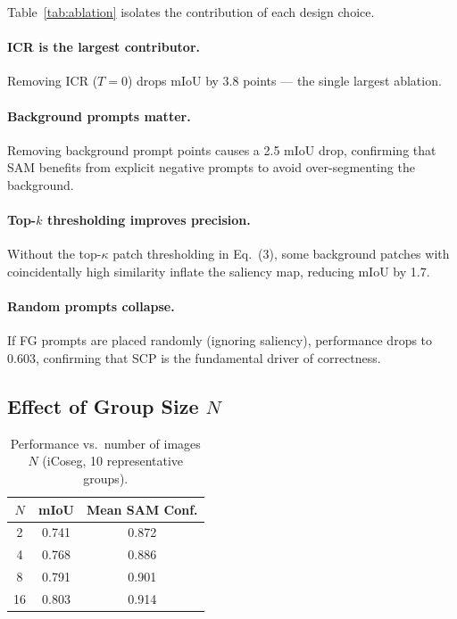 \documentclass[10pt,twocolumn,letterpaper]{article}
\begin{document}
Table~\ref{tab:ablation} isolates the contribution of each design choice.

\paragraph{ICR is the largest contributor.}
Removing ICR ($T=0$) drops mIoU by 3.8 points — the single largest ablation.

\paragraph{Background prompts matter.}
Removing background prompt points causes a 2.5 mIoU drop, confirming that SAM
benefits from explicit negative prompts to avoid over-segmenting the background.

\paragraph{Top-$k$ thresholding improves precision.}
Without the top-$\kappa$ patch thresholding in Eq.~(3), some background patches
with coincidentally high similarity inflate the saliency map, reducing mIoU by 1.7.

\paragraph{Random prompts collapse.}
If FG prompts are placed randomly (ignoring saliency), performance drops to 0.603,
confirming that SCP is the fundamental driver of correctness.

\subsection{Effect of Group Size $N$}

\begin{table}[t]
\centering
\caption{Performance vs.\ number of images $N$ (iCoseg, 10 representative groups).}
\label{tab:groupsize}
\begin{tabular}{@{}ccc@{}}
\toprule
$N$ & mIoU & Mean SAM Conf.\\
\midrule
2  & 0.741 & 0.872 \\
4  & 0.768 & 0.886 \\
8  & 0.791 & 0.901 \\
16 & 0.803 & 0.914 \\
\bottomrule
\end{tabular}
\end{table}
\end{document}
